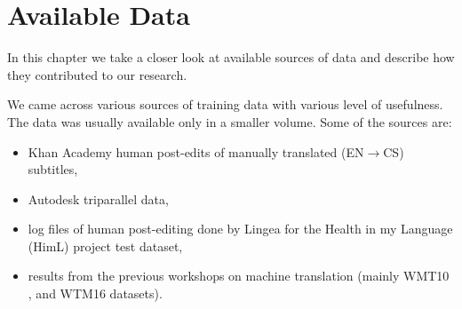 \chapter{Available Data}
\label{chap:data}




In this chapter we take a closer look at available
sources of data and describe how they contributed to our research.

We came across various sources of training data with various level
of usefulness. The data was usually available only in a smaller volume. Some of the sources
are:
\begin{itemize}
\item Khan Academy human
post-edits of manually translated (EN$\rightarrow$CS) subtitles,
\item Autodesk
triparallel data,
\item log files of human post-editing done by Lingea for the
Health in my Language (HimL) project test dataset,


\item results from the previous workshops on machine translation (mainly\linebreak
WMT10 \citep{callisonburch-EtAl:2010:WMT},
and WTM16 \citep{bojar-EtAl:2016:WMT1} datasets).
\end{itemize}

